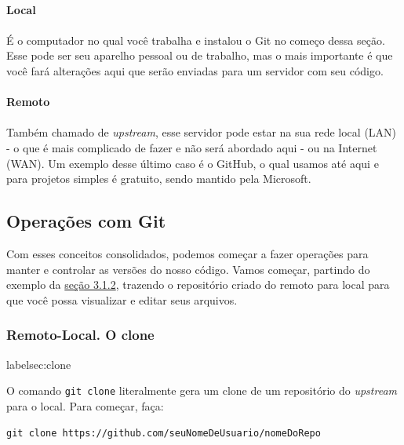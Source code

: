 \documentclass{article}
\begin{document}
  \paragraph{Local}
  \paragraph{}

  É o computador no qual você trabalha e instalou o Git no começo dessa seção. Esse pode ser seu aparelho pessoal ou 
  de trabalho, mas o mais importante é que você fará alterações aqui que serão enviadas para um servidor com seu código.

  \paragraph{Remoto}
  \paragraph{}

  Também chamado de \textit{upstream}, esse servidor pode estar na sua rede local (LAN) - o que é mais complicado de fazer e não será abordado aqui - ou na
  Internet (WAN). Um exemplo desse último caso é o GitHub, o qual usamos até aqui e para projetos simples é gratuito, sendo 
  mantido pela Microsoft. 

  \subsection{Operações com Git}

  Com esses conceitos consolidados, podemos começar a fazer operações para manter e controlar as versões do nosso código.
  Vamos começar, partindo do exemplo da \href{sec:branches}{seção 3.1.2}, trazendo o repositório criado do remoto para local para que você possa
  visualizar e editar seus arquivos. 

  \subsubsection{Remoto-Local. O clone}
  label{sec:clone}

  O comando \texttt{git clone} literalmente gera um clone de um repositório do \textit{upstream} para o local. Para começar, faça:
  
  \vspace{1ex}
  \texttt{git clone https://github.com/seuNomeDeUsuario/nomeDoRepo}
  \vspace{1ex}
  
\end{document}
